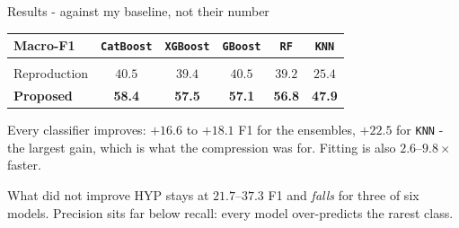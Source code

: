 \documentclass[xcolor=dvipsnames, aspectratio=169]{beamer}
\begin{document}
\begin{frame}{Results - against my baseline, not their number}
    \begin{center}
    \small
    \begin{tabular}{lccccc}
        \textbf{Macro-F1} & \texttt{CatBoost} & \texttt{XGBoost} & \texttt{GBoost} & \texttt{RF} & \texttt{KNN} \\[2pt]
        \hline \\[-8pt]
        Reproduction & $40.5$ & $39.4$ & $40.5$ & $39.2$ & $25.4$ \\
        \textcolor{sagedeep}{\textbf{Proposed}}
                     & \textcolor{sagedeep}{\textbf{58.4}} & \textcolor{sagedeep}{\textbf{57.5}}
                     & \textcolor{sagedeep}{\textbf{57.1}} & \textcolor{sagedeep}{\textbf{56.8}}
                     & \textcolor{sagedeep}{\textbf{47.9}} \\
    \end{tabular}
    \end{center}

    \vspace{0.5em}
    Every classifier improves: \alert{$+16.6$ to $+18.1$} F1 for the ensembles,
    \alert{$+22.5$} for \texttt{KNN} - the largest gain, which is what the
    compression was for. Fitting is also $2.6$--$9.8\times$ faster.

    \vspace{0.5em}
    \begin{block}{What did not improve}
        HYP stays at $21.7$--$37.3$ F1 and \emph{falls} for three of six models.
        Precision sits far below recall: every model over-predicts the rarest class.
    \end{block}
\end{frame}
\end{document}
